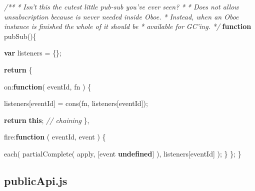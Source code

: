 \documentclass[]{article}
\newenvironment{Shaded}{}{}
\newcommand{\KeywordTok}[1]{\textcolor[rgb]{0.00,0.44,0.13}{\textbf{{#1}}}}
\newcommand{\DataTypeTok}[1]{\textcolor[rgb]{0.56,0.13,0.00}{{#1}}}
\newcommand{\CommentTok}[1]{\textcolor[rgb]{0.38,0.63,0.69}{\textit{{#1}}}}
\newcommand{\FunctionTok}[1]{\textcolor[rgb]{0.02,0.16,0.49}{{#1}}}
\newcommand{\NormalTok}[1]{{#1}}
\begin{document}
\begin{Shaded}
\begin{Highlighting}[]
\CommentTok{/**}
\CommentTok{ * Isn't this the cutest little pub-sub you've ever seen?}
\CommentTok{ * }
\CommentTok{ * Does not allow unsubscription because is never needed inside Oboe.}
\CommentTok{ * Instead, when an Oboe instance is finished the whole of it should be}
\CommentTok{ * available for GC'ing.}
\CommentTok{ */}
\KeywordTok{function} \FunctionTok{pubSub}\NormalTok{()\{}

   \KeywordTok{var} \NormalTok{listeners = \{\};}
                             
   \KeywordTok{return} \NormalTok{\{}

      \DataTypeTok{on}\NormalTok{:}\KeywordTok{function}\NormalTok{( eventId, fn ) \{}
         
         \NormalTok{listeners[eventId] = }\FunctionTok{cons}\NormalTok{(fn, listeners[eventId]);}

         \KeywordTok{return} \KeywordTok{this}\NormalTok{; }\CommentTok{// chaining}
      \NormalTok{\}, }
    
      \DataTypeTok{fire}\NormalTok{:}\KeywordTok{function} \NormalTok{( eventId, event ) \{}
               
         \FunctionTok{each}\NormalTok{(}
            \FunctionTok{partialComplete}\NormalTok{( apply, [event \textbar{}\textbar{} }\KeywordTok{undefined}\NormalTok{] ), }
            \NormalTok{listeners[eventId]}
         \NormalTok{);}
      \NormalTok{\}           }
   \NormalTok{\};}
\NormalTok{\}}
\end{Highlighting}
\end{Shaded}

\pagebreak

\subsection{publicApi.js}
\end{document}
